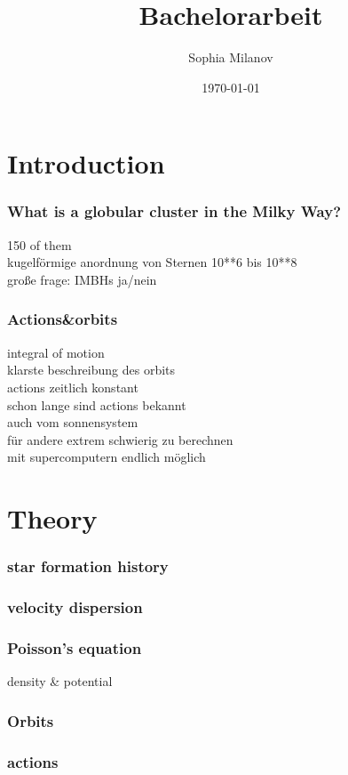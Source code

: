 \documentclass[a4paper,12pt,abstracton]{scrartcl}
\title{Bachelorarbeit}
\author{Sophia Milanov}
\date{\today}
\begin{document}


\begin{abstract}
\Blindtext 
\end{abstract}

\newpage

\tableofcontents

\newpage
\part{Introduction}
\section{What is a globular cluster in the Milky Way?}
150 of them \\
kugelförmige anordnung von Sternen 10**6 bis 10**8\\
große frage: IMBHs ja/nein
\section{Actions\&orbits}
integral of motion\\
klarste beschreibung des orbits\\
actions zeitlich konstant\\
schon lange sind actions bekannt\\
auch vom sonnensystem\\
für andere extrem schwierig zu berechnen\\
mit supercomputern endlich möglich


\newpage
\part{Theory}
\section{star formation history}
\section{velocity dispersion}
\section{Poisson's equation}
density \& potential
\section{Orbits}
\section{actions}
\newpage
\end{document}
